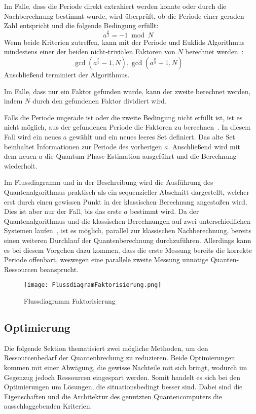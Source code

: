 Im Falle, dass die Periode direkt extrahiert werden konnte oder 
durch die Nachberechnung bestimmt wurde, wird überprüft, 
ob die Periode einer geraden Zahl entspricht und die folgende Bedingung erfüllt:
\[a^{\frac{p}{2}} = -1 \bmod N\]
Wenn beide Kriterien zutreffen, 
kann mit der Periode und 
Euklids Algorithmus mindestens einer der beiden nicht-trivialen Faktoren von \(N\) berechnet werden~\cite{Shor_1997}:
\[\gcd(a^{\frac{p}{2}}-1, N), \gcd(a^{\frac{p}{2}}+1, N)\]
Anschließend terminiert der Algorithmus. 

Im Falle, dass nur ein Faktor gefunden wurde, kann der zweite berechnet werden, 
indem \(N\) durch den gefundenen Faktor dividiert wird.

Falls die Periode ungerade ist oder die zweite Bedingung nicht erfüllt ist, 
ist es nicht möglich, aus der gefundenen Periode die Faktoren zu berechnen~\cite{Shor_1997}.
In diesem Fall wird ein neues \(a\) gewählt und ein neues leeres Set definiert. 
Das alte Set beinhaltet Informationen zur Periode des vorherigen \(a\).
Anschließend wird mit dem neuen \(a\) die Quantum-Phase-Estimation ausgeführt und 
die Berechnung wiederholt.

Im Flussdiagramm und in der Beschreibung 
wird die Ausführung des Quantenalgorithmus praktisch als ein sequenzieller Abschnitt dargestellt, 
welcher erst durch einen gewissen Punkt in der klassischen Berechnung angestoßen wird.
Dies ist aber nur der Fall, bis das erste \(a\) bestimmt wird.
Da der Quantenalgorithmus und die klassischen Berechnungen auf zwei unterschiedlichen Systemen laufen~\cite{IBMQuantumServerless2023}, 
ist es möglich, parallel zur klassischen Nachberechnung, 
bereits einen weiteren Durchlauf der Quantenberechnung durchzuführen. 
Allerdings kann es bei diesem Vorgehen dazu kommen, 
dass die erste Messung bereits die korrekte Periode offenbart, 
weswegen eine parallele zweite Messung unnötige Quanten-Ressourcen beansprucht.

\begin{figure} 
  \centering
  \texttt{[image: FlussdiagramFaktorisierung.png]}
  \caption{Flussdiagramm Faktorisierung}
  \label{fig:Flussdiagramm}
\end{figure}

\subsection{Optimierung} \label{Optimierung}
Die folgende Sektion thematisiert zwei mögliche Methoden, 
um den Ressourcenbedarf der Quantenbrechung zu reduzieren.
Beide Optimierungen kommen mit einer Abwägung, 
die gewisse Nachteile mit sich bringt,
wodurch im Gegenzug jedoch Ressourcen eingespart werden.
Somit handelt es sich bei den Optimierungen um Lösungen, 
die situationsbedingt besser sind.
Dabei sind die Eigenschaften und die Architektur des genutzten Quantencomputers die ausschlaggebenden Kriterien.

